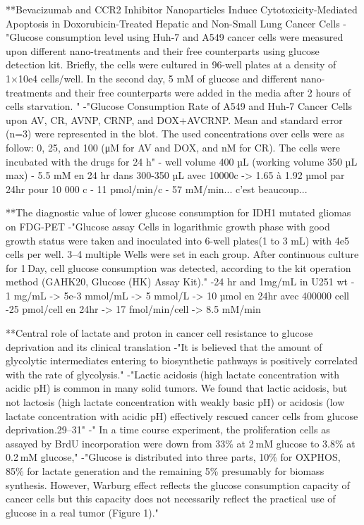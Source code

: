 \documentclass[11pt,a4paper]{article}
\begin{document}
**Bevacizumab and CCR2 Inhibitor Nanoparticles Induce Cytotoxicity-Mediated Apoptosis in Doxorubicin-Treated Hepatic and Non-Small Lung Cancer Cells 
-"Glucose consumption level using Huh-7 and A549 cancer cells were measured upon different nano-treatments and their free counterparts using glucose detection kit. Briefly, the cells were cultured in 96-well plates at a density of 1×10e4 cells/well. In the second day, 5 mM of glucose and different nano-treatments and their free counterparts were added in the media after 2 hours of cells starvation. "
-"Glucose Consumption Rate of A549 and Huh-7 Cancer Cells upon AV, CR, AVNP, CRNP, and DOX+AVCRNP. Mean and standard error (n=3) were represented in the blot. The used concentrations over cells were as follow: 0, 25, and 100 (μM for AV and DOX, and nM for CR). The cells were incubated with the drugs for 24 h"
- well volume 400 µL (working volume 350 µL max)
- 5.5 mM en 24 hr dans 300-350 µL  avec 10000c -> 1.65 à 1.92 µmol par 24hr pour 10 000 c 
- 11 pmol/min/c 
- 57 mM/min... c'est beaucoup...

**The diagnostic value of lower glucose consumption for IDH1 mutated gliomas on FDG-PET
-"Glucose assay
Cells in logarithmic growth phase with good growth status were taken and inoculated into 6-well plates(1 to 3 mL) with 4e5 cells per well. 3–4 multiple Wells were set in each group. After continuous culture for 1 Day, cell glucose consumption was detected, according to the kit operation method (GAHK20, Glucose (HK) Assay Kit)."
-24 hr and 1mg/mL in  U251 wt
- 1 mg/mL -> 5e-3 mmol/mL -> 5 mmol/L -> 10 µmol en 24hr avec 400000 cell
-25 pmol/cell en 24hr -> 17 fmol/min/cell -> 8.5 mM/min


**Central role of lactate and proton in cancer cell resistance to glucose deprivation and its clinical translation
-"It is believed that the amount of glycolytic intermediates entering to biosynthetic pathways is positively correlated with the rate of glycolysis."
-"Lactic acidosis (high lactate concentration with acidic pH) is common in many solid tumors. We found that lactic acidosis, but not lactosis (high lactate concentration with weakly basic pH) or acidosis (low lactate concentration with acidic pH) effectively rescued cancer cells from glucose deprivation.29–31"
-" In a time course experiment, the proliferation cells as assayed by BrdU incorporation were down from 33\% at 2 mM glucose to 3.8\% at 0.2 mM glucose,"
-"Glucose is distributed into three parts, 10\% for OXPHOS, 85\% for lactate generation and the remaining 5\% presumably for biomass synthesis. However, Warburg effect reflects the glucose consumption capacity of cancer cells but this capacity does not necessarily reflect the practical use of glucose in a real tumor (Figure 1)."
\end{document}
